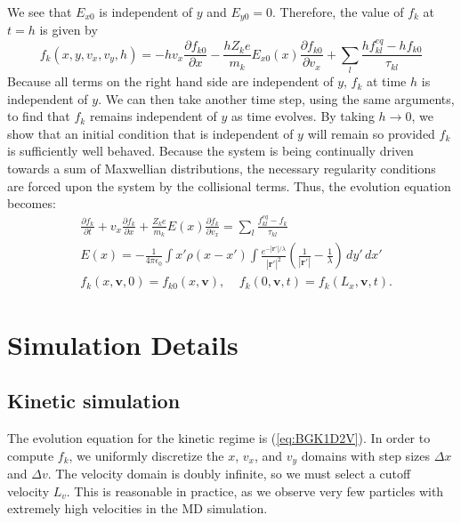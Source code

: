 \documentclass{article}
\begin{document}
We see that $E_{x0}$ is independent of $y$ and $E_{y0}=0$. Therefore, the value of $f_k$ at $t=h$ is given by
\[f_k(x,y,v_x,v_y,h)=-hv_x\frac{\partial f_{k0}}{\partial x}-\frac{hZ_k e}{m_k}E_{x0}(x)\frac{\partial f_{k0}}{\partial v_x}+\sum_l\frac{hf_{kl}^{eq}-hf_{k0}}{\tau_{kl}}
 \]
Because all terms on the right hand side are independent of $y$, $f_k$ at time $h$ is independent of $y$. We can then take another time step, using the same arguments, to find that $f_k$ remains independent of $y$ as time evolves. By taking $h\to0$, we show that an initial condition that is independent of $y$ will remain so provided $f_k$ is sufficiently well behaved. Because the system is being continually driven towards a sum of Maxwellian distributions, the necessary regularity conditions are forced upon the system by the collisional terms. Thus, the evolution equation becomes:
\begin{equation}
\begin{split}
&\frac{\partial f_k}{\partial t}+v_x\frac{\partial f_k}{\partial x}+\frac{Z_ke}{m_k}E(x)\frac{\partial f_k}{\partial v_x}=\sum_l\frac{f_{kl}^{eq}-f_k}{\tau_{kl}}\\
&E(x)=-\frac{1}{4\pi\epsilon_0}\int x'\rho(x-x')\int\frac{e^{-|\mathbf{r}'|/\lambda}}{|\mathbf{r}'|^2}\left(\frac{1}{|\mathbf{r}'|}-\frac{1}{\lambda}\right)\,dy'\,dx'\\
&f_k(x,\mathbf{v},0)=f_{k0}(x,\mathbf{v}),\;\;\;\;
f_k(0,\mathbf{v},t)=f_{k}(L_x,\mathbf{v},t).
\end{split}\label{eq:BGK1D2V}
\end{equation}

\section{Simulation Details}

\subsection{Kinetic simulation}

The evolution equation for the kinetic regime is (\ref{eq:BGK1D2V}). In order to compute $f_k$, we uniformly discretize the $x$, $v_x$, and $v_y$ domains with step sizes $\Delta x$ and $\Delta v$. The velocity domain is doubly infinite, so we must select a cutoff velocity $L_v$. This is reasonable in practice, as we observe very few particles with extremely high velocities in the MD simulation. 
\end{document}
